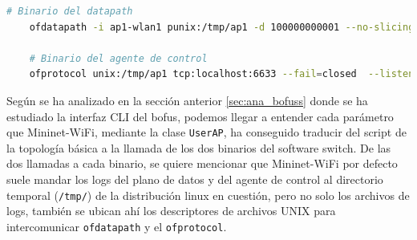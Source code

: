 \begin{lstlisting}[language= bash, style=Consola, caption={Puesta en marcha del BOFUSS},label=code:bofussLaunch]
    # Binario del datapath 
    ofdatapath -i ap1-wlan1 punix:/tmp/ap1 -d 100000000001 --no-slicing 1> /tmp/ap1-ofd.log 2> /tmp/ap1-ofd.log 
   
    # Binario del agente de control
    ofprotocol unix:/tmp/ap1 tcp:localhost:6633 --fail=closed  --listen=punix:/tmp/ap1.listen 1> /tmp/ap1-ofp.log 2>/tmp/ap1-ofp.log 
\end{lstlisting}
\vspace{0.5cm}

Según se ha analizado en la sección anterior \ref{sec:ana_bofuss} donde se ha estudiado la interfaz CLI del \gls{bofus}, podemos llegar a entender cada parámetro que Mininet-WiFi, mediante la clase \texttt{UserAP}, ha conseguido traducir del script de la topología básica a la llamada de los dos binarios del software switch.  De las dos llamadas a cada binario, se quiere mencionar que Mininet-WiFi por defecto suele mandar los logs del plano de datos y del agente de control al directorio temporal (\texttt{/tmp/}) de la distribución linux en cuestión, pero no solo los archivos de logs, también se ubican ahí los descriptores de archivos UNIX para intercomunicar \texttt{ofdatapath} y el \texttt{ofprotocol}.
